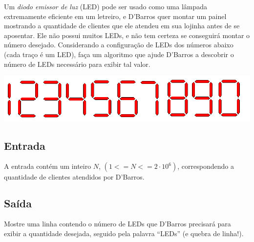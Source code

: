 %

Um \emph{diodo emissor de luz} (LED) pode ser usado como uma lâmpada extremamente 
eficiente em um letreiro, e D'Barros quer montar um painel mostrando a quantidade 
de clientes que ele atendeu em sua lojinha antes de se aposentar. Ele não possui 
muitos LEDs, e não tem certeza se conseguirá montar o número desejado. Considerando 
a configuração de LEDs dos números abaixo (cada traço é um LED), faça um algoritmo 
que ajude D'Barros a descobrir o número de LEDs necessário para exibir tal valor.

\begin{center}
\includegraphics[width=.8\textwidth]{leds}%
\end{center}%

\subsection*{Entrada}%
A entrada contém um inteiro $N$, $(1 <= N <= 2\cdot10^6)$, correspondendo a quantidade de
clientes atendidos por D'Barros.

\subsection*{Saída}%
Mostre uma linha contendo o número de LEDs que D'Barros precisará para exibir a
quantidade desejada, seguido pela palavra ``LEDs'' (e quebra de linha!).

